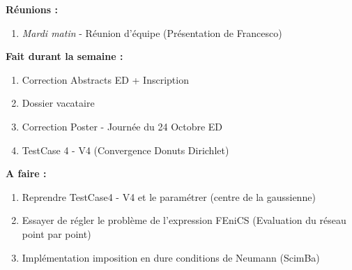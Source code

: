 \textbf{Réunions :}
\begin{enumerate}[label=\textbullet]
	\item \textit{Mardi matin} - Réunion d'équipe (Présentation de Francesco)
\end{enumerate}
\textbf{Fait durant la semaine :}
\begin{enumerate}[label=\textbullet]
	\item Correction Abstracts ED + Inscription
	\item Dossier vacataire
	\item Correction Poster - Journée du 24 Octobre ED
	\item TestCase 4 - V4 (Convergence Donuts Dirichlet)
\end{enumerate}
\textbf{A faire :}
\begin{enumerate}[label=\textbullet]
	\item Reprendre TestCase4 - V4 et le paramétrer (centre de la gaussienne)
	\item Essayer de régler le problème de l'expression FEniCS (Evaluation du réseau point par point)
	\item Implémentation imposition en dure conditions de Neumann (ScimBa)
\end{enumerate}